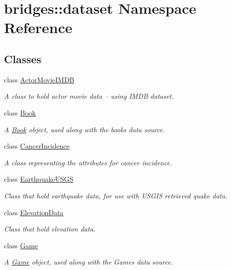 \hypertarget{namespacebridges_1_1dataset}{}\section{bridges\+:\+:dataset Namespace Reference}
\label{namespacebridges_1_1dataset}
\subsection*{Classes}
\begin{DoxyCompactItemize}
\item 
class \hyperlink{classbridges_1_1dataset_1_1_actor_movie_i_m_d_b}{Actor\+Movie\+I\+M\+DB}
\begin{DoxyCompactList}\small\item\em A class to hold actor movie data -- using I\+M\+DB dataset. \end{DoxyCompactList}\item 
class \hyperlink{classbridges_1_1dataset_1_1_book}{Book}
\begin{DoxyCompactList}\small\item\em A \hyperlink{classbridges_1_1dataset_1_1_book}{Book} object, used along with the books data source. \end{DoxyCompactList}\item 
class \hyperlink{classbridges_1_1dataset_1_1_cancer_incidence}{Cancer\+Incidence}
\begin{DoxyCompactList}\small\item\em A class representing the attributes for cancer incidence. \end{DoxyCompactList}\item 
class \hyperlink{classbridges_1_1dataset_1_1_earthquake_u_s_g_s}{Earthquake\+U\+S\+GS}
\begin{DoxyCompactList}\small\item\em Class that hold earthquake data, for use with U\+S\+G\+IS retrieved quake data. \end{DoxyCompactList}\item 
class \hyperlink{classbridges_1_1dataset_1_1_elevation_data}{Elevation\+Data}
\begin{DoxyCompactList}\small\item\em Class that hold elevation data. \end{DoxyCompactList}\item 
class \hyperlink{classbridges_1_1dataset_1_1_game}{Game}
\begin{DoxyCompactList}\small\item\em A \hyperlink{classbridges_1_1dataset_1_1_game}{Game} object, used along with the Games data source. \end{DoxyCompactList}\item 

\end{DoxyCompactItemize}
